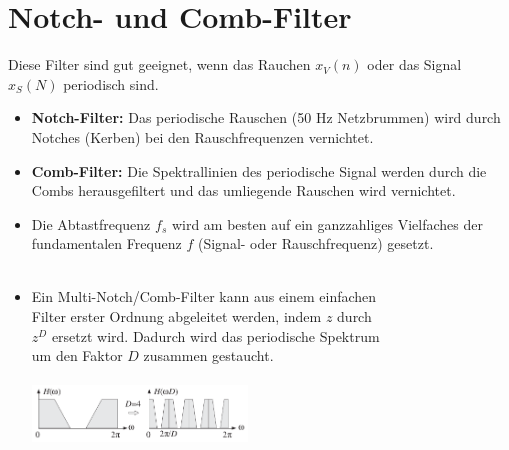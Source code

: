 \section{Notch- und Comb-Filter}
	Diese Filter sind gut geeignet, wenn das Rauchen $x_V(n)$ oder das Signal $x_S(N)$ periodisch sind.\\[-0.6cm]
	\begin{itemize}
	 \item \textbf{Notch-Filter:} Das periodische Rauschen (50 Hz Netzbrummen) wird durch Notches (Kerben) bei den Rauschfrequenzen vernichtet.\\[-0.6cm]
	 \item \textbf{Comb-Filter:} Die Spektrallinien des periodische Signal werden durch die Combs herausgefiltert und das umliegende Rauschen wird vernichtet.\\[-0.6cm]	 
	 \item Die Abtastfrequenz $f_s$ wird am besten auf ein ganzzahliges Vielfaches der\\ fundamentalen Frequenz $f$ (Signal- oder Rauschfrequenz) gesetzt.\\[-0.75cm] \hspace*{13cm}\\[-0.35cm]
	 \item Ein Multi-Notch/Comb-Filter kann aus einem einfachen\\Filter erster Ordnung abgeleitet werden, indem $z$ durch \\$z^{D}$ ersetzt wird. Dadurch wird das periodische Spektrum\\ um den Faktor $D$ zusammen gestaucht.\\[-1.8cm]
	  \hspace*{11cm}\\[0.1cm]
	  \hspace*{10cm}\includegraphics[width = 0.45\textwidth]{pic/combNotchStauchung.pdf}\\[-1.4cm]
	\end{itemize}
